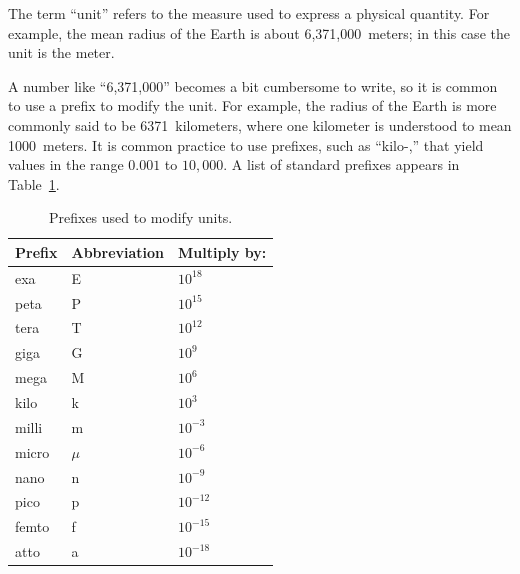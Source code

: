 

\label{m0072_Units} %

The term ``unit'' refers to the measure used to express a physical quantity.
For example, the mean radius of the Earth is about 6,371,000~meters; in this case the unit is the meter.

A number like ``6,371,000'' becomes a bit cumbersome to write, so it is common to use a prefix to modify the unit.
For example, the radius of the Earth is more commonly said to be 6371~kilometers, where one kilometer is understood to mean 1000~meters. 
It is common practice to use prefixes, such as ``kilo-,'' that yield values in the range $0.001$ to $10,000$.  
A list of standard prefixes appears in Table~\ref{m0072_tPrefix}.
%
\begin{table}[b!]
\begin{center}
\begin{tabular}{lll}
Prefix & Abbreviation & Multiply by: \\
\hline
exa & E & $10^{18}$ \\
peta & P & $10^{15}$ \\
tera & T & $10^{12}$ \\
giga & G & $10^{9}$ \\
mega & M & $10^{6}$ \\
kilo & k & $10^{3}$ \\
milli & m & $10^{-3}$ \\
micro & $\mu$ & $10^{-6}$ \\
nano & n & $10^{-9}$ \\
pico & p & $10^{-12}$ \\
femto & f & $10^{-15}$ \\
atto & a & $10^{-18}$ \\
\end{tabular}
\end{center}
\caption{Prefixes used to modify units.}
\label{m0072_tPrefix}
\end{table}

